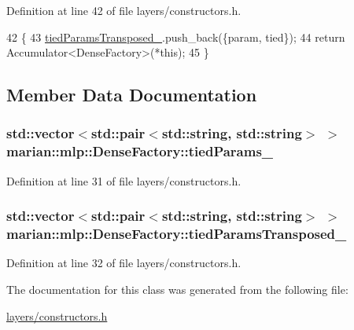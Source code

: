 Definition at line 42 of file layers/constructors.\+h.


\begin{DoxyCode}
42                                                                                           \{
43     \hyperlink{classmarian_1_1mlp_1_1DenseFactory_a3ba79a0f9f037b4b22d2309efc91f1e7}{tiedParamsTransposed\_}.push\_back(\{param, tied\});
44     \textcolor{keywordflow}{return} Accumulator<DenseFactory>(*this);
45   \}
\end{DoxyCode}


\subsection{Member Data Documentation}
\subsubsection[{\texorpdfstring{tied\+Params\+\_\+}{tiedParams_}}]{\setlength{\rightskip}{0pt plus 5cm}std\+::vector$<$std\+::pair$<$std\+::string, std\+::string$>$ $>$ marian\+::mlp\+::\+Dense\+Factory\+::tied\+Params\+\_\+\hspace{0.3cm}{\ttfamily [protected]}}\hypertarget{classmarian_1_1mlp_1_1DenseFactory_a36527627208b9e0a0e08f32ffed6afeb}{}\label{classmarian_1_1mlp_1_1DenseFactory_a36527627208b9e0a0e08f32ffed6afeb}


Definition at line 31 of file layers/constructors.\+h.

\subsubsection[{\texorpdfstring{tied\+Params\+Transposed\+\_\+}{tiedParamsTransposed_}}]{\setlength{\rightskip}{0pt plus 5cm}std\+::vector$<$std\+::pair$<$std\+::string, std\+::string$>$ $>$ marian\+::mlp\+::\+Dense\+Factory\+::tied\+Params\+Transposed\+\_\+\hspace{0.3cm}{\ttfamily [protected]}}\hypertarget{classmarian_1_1mlp_1_1DenseFactory_a3ba79a0f9f037b4b22d2309efc91f1e7}{}\label{classmarian_1_1mlp_1_1DenseFactory_a3ba79a0f9f037b4b22d2309efc91f1e7}


Definition at line 32 of file layers/constructors.\+h.



The documentation for this class was generated from the following file\+:\begin{DoxyCompactItemize}
\item 
\hyperlink{layers_2constructors_8h}{layers/constructors.\+h}\end{DoxyCompactItemize}
